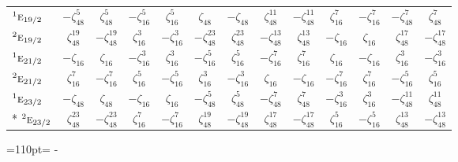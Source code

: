 \documentclass[10pt,a4paper]{article}
\newcommand{\needspace}[1]{\par\penalty-100\begingroup\dimen0=#1\relax\dimen2=\pagegoal
  \advance\dimen2-\pagetotal\ifdim\dimen0>\dimen2\relax\ifdim\dimen2>0pt\vfil\break\fi\fi
  \endgroup}
\numberwithin{equation}{section}
\newcommand{\irr}[1]{\text{\normalfont\scshape #1}}
\newcommand{\conjpair}[1]{{}^{#1}}
\newcommand{\rootunity}[1]{\zeta_{#1}}
\begin{document}
{\begin{longtable}{@{}lcccccccccccc@{}}
$\conjpair{1}\irr{e}_{19/2}$ & $-\rootunity{48}^{5}$ & $\rootunity{48}^{5}$ & $-\rootunity{16}^{5}$ & $\rootunity{16}^{5}$ & $\rootunity{48}$ & $-\rootunity{48}$ & $\rootunity{48}^{11}$ & $-\rootunity{48}^{11}$ & $\rootunity{16}^{7}$ & $-\rootunity{16}^{7}$ & $-\rootunity{48}^{7}$ & $\rootunity{48}^{7}$\\
$\conjpair{2}\irr{e}_{19/2}$ & $\rootunity{48}^{19}$ & $-\rootunity{48}^{19}$ & $\rootunity{16}^{3}$ & $-\rootunity{16}^{3}$ & $-\rootunity{48}^{23}$ & $\rootunity{48}^{23}$ & $-\rootunity{48}^{13}$ & $\rootunity{48}^{13}$ & $-\rootunity{16}$ & $\rootunity{16}$ & $\rootunity{48}^{17}$ & $-\rootunity{48}^{17}$\\
$\conjpair{1}\irr{e}_{21/2}$ & $-\rootunity{16}$ & $\rootunity{16}$ & $-\rootunity{16}^{3}$ & $\rootunity{16}^{3}$ & $-\rootunity{16}^{5}$ & $\rootunity{16}^{5}$ & $-\rootunity{16}^{7}$ & $\rootunity{16}^{7}$ & $\rootunity{16}$ & $-\rootunity{16}$ & $\rootunity{16}^{3}$ & $-\rootunity{16}^{3}$\\
$\conjpair{2}\irr{e}_{21/2}$ & $\rootunity{16}^{7}$ & $-\rootunity{16}^{7}$ & $\rootunity{16}^{5}$ & $-\rootunity{16}^{5}$ & $\rootunity{16}^{3}$ & $-\rootunity{16}^{3}$ & $\rootunity{16}$ & $-\rootunity{16}$ & $-\rootunity{16}^{7}$ & $\rootunity{16}^{7}$ & $-\rootunity{16}^{5}$ & $\rootunity{16}^{5}$\\
$\conjpair{1}\irr{e}_{23/2}$ & $-\rootunity{48}$ & $\rootunity{48}$ & $-\rootunity{16}$ & $\rootunity{16}$ & $-\rootunity{48}^{5}$ & $\rootunity{48}^{5}$ & $-\rootunity{48}^{7}$ & $\rootunity{48}^{7}$ & $-\rootunity{16}^{3}$ & $\rootunity{16}^{3}$ & $-\rootunity{48}^{11}$ & $\rootunity{48}^{11}$\\*
$\conjpair{2}\irr{e}_{23/2}$ & $\rootunity{48}^{23}$ & $-\rootunity{48}^{23}$ & $\rootunity{16}^{7}$ & $-\rootunity{16}^{7}$ & $\rootunity{48}^{19}$ & $-\rootunity{48}^{19}$ & $\rootunity{48}^{17}$ & $-\rootunity{48}^{17}$ & $\rootunity{16}^{5}$ & $-\rootunity{16}^{5}$ & $\rootunity{48}^{13}$ & $-\rootunity{48}^{13}$\\
\bottomrule\end{longtable}}
\needspace{110pt}
\end{document}

